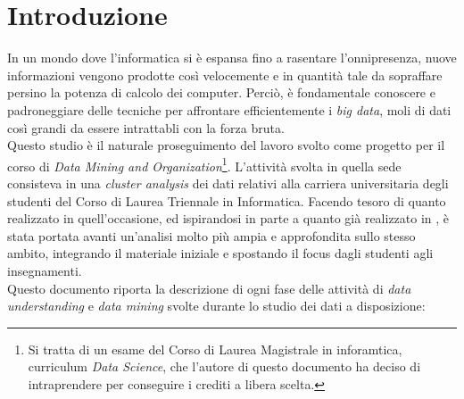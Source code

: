 \chapter{Introduzione}
\label{ch:intro}

In un mondo dove l'informatica si è espansa fino a rasentare l'onnipresenza, nuove informazioni vengono prodotte così velocemente e in quantità tale da sopraffare persino la potenza di calcolo dei computer. Perciò, è fondamentale conoscere e padroneggiare delle tecniche per affrontare efficientemente i \textit{big data}, moli di dati così grandi da essere intrattabli con la forza bruta. \\

Questo studio è il naturale proseguimento del lavoro svolto come progetto per il corso di \textit{Data Mining and Organization}\footnote{Si tratta di un esame del Corso di Laurea Magistrale in inforamtica, curriculum \textit{Data Science}, che l'autore di questo documento ha deciso di intraprendere per conseguire i crediti a libera scelta.}. L'attività svolta in quella sede consisteva in una \textit{cluster analysis} dei dati relativi alla carriera universitaria degli studenti del Corso di Laurea Triennale in Informatica. Facendo tesoro di quanto realizzato in quell'occasione, ed ispirandosi in parte a quanto già realizzato in \cite{articolo}, è stata portata avanti un'analisi molto più ampia e approfondita sullo stesso ambito, integrando il materiale iniziale e spostando il focus dagli studenti agli insegnamenti. \\

Questo documento riporta la descrizione di ogni fase delle attività di \textit{data understanding} e \textit{data mining} svolte durante lo studio dei dati a disposizione:

